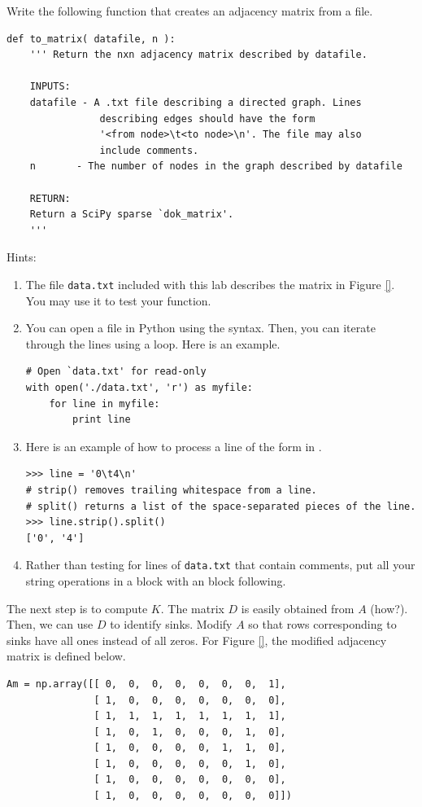 \begin{problem}
Write the following function that creates an adjacency matrix from a file.
\begin{lstlisting}
def to_matrix( datafile, n ):
    ''' Return the nxn adjacency matrix described by datafile.
    
    INPUTS:
    datafile - A .txt file describing a directed graph. Lines 
    			describing edges should have the form 
				'<from node>\t<to node>\n'. The file may also 
				include comments.
    n		- The number of nodes in the graph described by datafile
    
    RETURN:
    Return a SciPy sparse `dok_matrix'.
    '''
\end{lstlisting}
Hints:
\begin{enumerate}
\item The file \texttt{data.txt} included with this lab describes the matrix in Figure \ref{}. 
You may use it to test your function.

\item You can open a file in Python using the  syntax. 
Then, you can iterate through the lines using a  loop.
Here is an example.
\begin{lstlisting}
# Open `data.txt' for read-only
with open('./data.txt', 'r') as myfile:
    for line in myfile:
        print line
\end{lstlisting}

\item Here is an example of how to process a line of the form in .
\begin{lstlisting}
>>> line = '0\t4\n'
# strip() removes trailing whitespace from a line.
# split() returns a list of the space-separated pieces of the line.
>>> line.strip().split()
['0', '4']
\end{lstlisting}

\item Rather than testing for lines of \texttt{data.txt} that contain comments, put all your string operations in a  block with an  block following.
\end{enumerate}
\end{problem}

The next step is to compute $K$. 
The matrix $D$ is easily obtained from $A$ (how?). 
Then, we can use $D$ to identify sinks.
Modify $A$ so that rows corresponding to sinks have all ones instead of all zeros.
For Figure \ref{}, the modified adjacency matrix is defined below.
\begin{lstlisting}
Am = np.array([[ 0,  0,  0,  0,  0,  0,  0,  1],
               [ 1,  0,  0,  0,  0,  0,  0,  0],
               [ 1,  1,  1,  1,  1,  1,  1,  1],
               [ 1,  0,  1,  0,  0,  0,  1,  0],
               [ 1,  0,  0,  0,  0,  1,  1,  0],
               [ 1,  0,  0,  0,  0,  0,  1,  0],
               [ 1,  0,  0,  0,  0,  0,  0,  0],
               [ 1,  0,  0,  0,  0,  0,  0,  0]])
\end{lstlisting}

